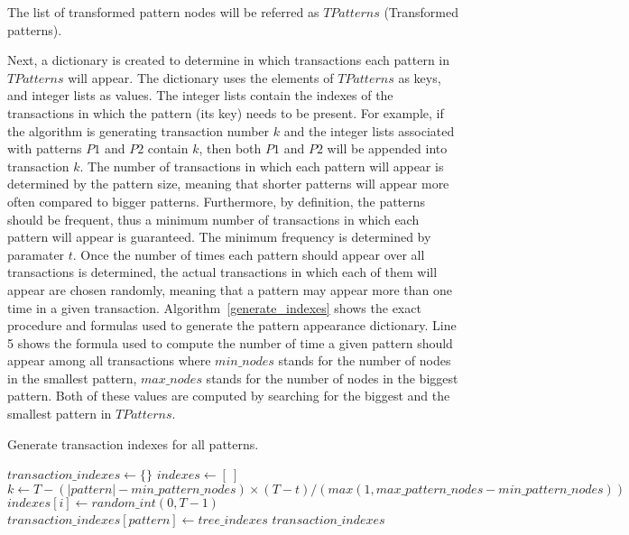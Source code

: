 \documentclass{acm_proc_article-sp-sigmod09}
\begin{document}
The list of transformed pattern nodes will be referred as $TPatterns$ (Transformed patterns).

Next, a dictionary is created to determine in which transactions each pattern in $TPatterns$ will appear. The dictionary uses the elements of $TPatterns$ as keys, and integer lists as values. The integer lists contain the indexes of the transactions in which the pattern (its key) needs to be present. For example, if the algorithm is generating transaction number $k$ and the integer lists associated with patterns $P1$ and $P2$ contain $k$, then both $P1$ and $P2$ will be appended into transaction $k$. The number of transactions in which each pattern will appear is determined by the pattern size, meaning that shorter patterns will appear more often compared to bigger patterns. Furthermore, by definition, the patterns should be frequent, thus a minimum number of transactions in which each pattern will appear is guaranteed. The minimum frequency is determined by paramater $t$. Once the number of times each pattern should appear over all transactions is determined, the actual transactions in which each of them will appear are chosen randomly, meaning that a pattern may appear more than one time in a given transaction. Algorithm~\ref{generate_indexes} shows the exact procedure and formulas used to generate the pattern appearance dictionary. Line 5 shows the formula used to compute the number of time a given pattern should appear among all transactions where $min\_nodes$ stands for the number of nodes in the smallest pattern, $max\_nodes$ stands for the number of nodes in the biggest pattern. Both of these values are computed by searching for the biggest and the smallest pattern in $TPatterns$.
\begin{algorithm}
\caption{Generate transaction indexes for all patterns.}
\label{generate_indexes}
\begin{algorithmic}[1]
\State $transaction\_indexes \gets \{\}$
	\State $indexes \gets [\:]$
	\State $k \gets T - (|pattern| - min\_pattern\_nodes) \times (T - t) / (max(1, max\_pattern\_nodes - min\_pattern\_nodes))$
	\State $indexes[i] \gets random\_int(0, T - 1)$
	\EndFor
	\State $transaction\_indexes[pattern] \gets tree\_indexes$
\EndFor
\Return $transaction\_indexes$
\EndFunction
\end{algorithmic}
\end{algorithm}
\end{document}
